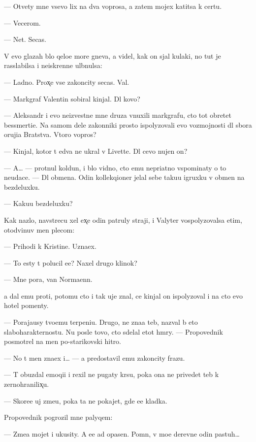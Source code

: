 \documentclass[10pt]{book}
\begin{document}
— Otvety mne vsevo lix na dva voprosa, a zatem mojex katitsa k certu.

— Vecerom.

— Net. Se{\y}cas.

V {\y}evo glazah b{\yi}lo qelo{\y}e more gneva, {\y}a videl, kak on sjal kulaki, no tut je rasslabilsa i ne{\y}iskrenne ul{\yi}bnulsa:

— Ladno. Prox̨e vse zakoncity se{\y}cas. Val{\ia}{\y}.

— Markgraf Valentin sobiral kinjal{\yi}. Dl{\ia} kovo?

— Aleksandr i {\y}evo ne{\y}izvestn{\yi}{\y}e mne druz{\y}a vnuxili markgrafu, cto tot obretet bessmerti{\y}e. Na samom dele zakonniki prosto ispolyzovali {\y}evo vozmojnosti dl{\ia} sbora oruji{\y}a Bratstva. Vtoro{\y} vopros?

— Kinjal, kotor{\yi}{\y} t{\yi} {\y}edva ne ukral v Livette. Dl{\ia} cevo nujen on?

— A… — prot{\ia}nul koldun, i b{\yi}lo vidno, cto {\y}emu nepri{\y}atno vspominaty o to{\y} neudace. — Dl{\ia} obmena. Odin kollekqioner jelal sebe taku{\y}u igruxku v obmen na bezdeluxku.

— Kaku{\y}u bezdeluxku?

Kak nazlo, navstrecu xel {\y}ex̨e odin patruly straji, i Valyter vospolyzovalsa etim, otodvinuv men{\ia} plecom:

— Prihodi k Kristine. Uzna{\y}ex.

— To {\y}esty t{\yi} polucil {\y}e{\y}e? Naxel drugo{\y} klinok?

— Mne pora, van Norma{\y}enn.

{\Y}a dal {\y}emu pro{\y}ti, potomu cto i tak uje znal, ce{\y} kinjal on ispolyzoval i na cto {\y}evo hotel pomen{\ia}ty.



— Poraja{\y}usy tvo{\y}emu terpeni{\y}u. Drugo{\y}, ne zna{\y}a teb{\ia}, nazval b{\yi} eto slaboharakternost{\y}u. Nu posle tovo, cto sdelal etot hm{\yi}ry. — Propovednik posmotrel na men{\ia} po-starikovski hitro.

— No t{\yi} men{\ia} zna{\y}ex i… — {\Y}a predostavil {\y}emu zakoncity frazu.

— T{\yi} obuzdal emoqi{\y}i i rexil ne pugaty kr{\yi}su, poka ona ne privedet teb{\ia} k zernohranilix̨u.

— Skore{\y}e uj zme{\y}u, poka ta ne pokajet, gde {\y}e{\y}e kladka.

Propovednik pogrozil mne palyqem:

— Zme{\y}a mojet i ukusity. A {\y}e{\y}e {\y}ad opasen. Pomn{\iu}, v mo{\y}e{\y} derevne odin pastuh…
\end{document}
